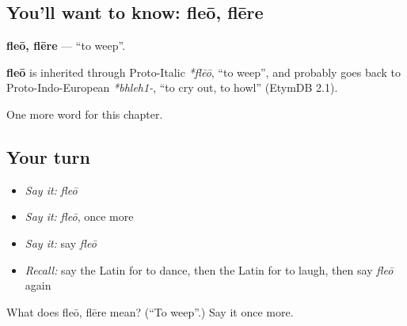 \subsection*{You'll want to know: fleō, flēre}
\textbf{fleō, flēre} — \textquotedblleft{}to weep\textquotedblright{}.

\begin{cousinweb}
\textbf{fleō} is inherited through Proto-Italic \emph{*flēō}, \textquotedblleft{}to weep\textquotedblright{}, and probably goes back to Proto-Indo-European \emph{*bhleh1-}, \textquotedblleft{}to cry out, to howl\textquotedblright{} (EtymDB 2.1).
\end{cousinweb}

\begin{grammarlens}[title={What you've built}]
One more word for this chapter.
\end{grammarlens}

\subsection*{Your turn}
\begin{itemize}
\raggedright
  \item \emph{Say it:} \emph{fleō}
  \item \emph{Say it:} \emph{fleō}, once more
  \item \emph{Say it:} say \emph{fleō}
  \item \emph{Recall:} say the Latin for to dance, then the Latin for to laugh, then say \emph{fleō} again
\end{itemize}

\begin{tcolorbox}[breakable,colback=teal!4,colframe=teal!35!black,title={Before you move on}]
What does fleō, flēre mean? (\textquotedblleft{}To weep\textquotedblright{}.) Say it once more.
\end{tcolorbox}
